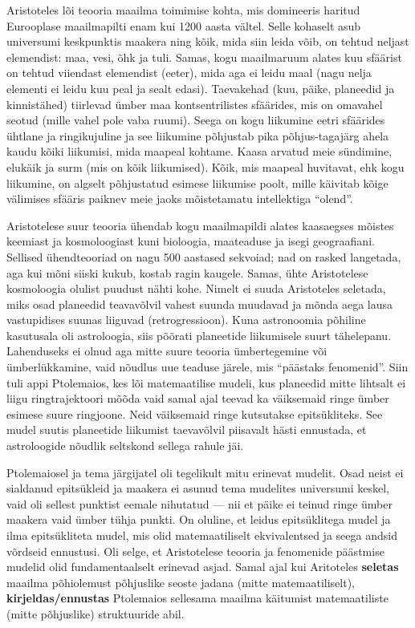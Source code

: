 \documentclass[]{book}
\begin{document}
Aristoteles lõi teooria maailma toimimise kohta, mis domineeris haritud
Eurooplase maailmapilti enam kui 1200 aasta vältel. Selle kohaselt asub
universumi keskpunktis maakera ning kõik, mida siin leida võib, on
tehtud neljast elemendist: maa, vesi, õhk ja tuli. Samas, kogu
maailmaruum alates kuu sfäärist on tehtud viiendast elemendist (eeter),
mida aga ei leidu maal (nagu nelja elementi ei leidu kuu peal ja sealt
edasi). Taevakehad (kuu, päike, planeedid ja kinnistähed) tiirlevad
ümber maa kontsentrilistes sfäärides, mis on omavahel seotud (mille
vahel pole vaba ruumi). Seega on kogu liikumine eetri sfäärides ühtlane
ja ringikujuline ja see liikumine põhjustab pika põhjus-tagajärg ahela
kaudu kõiki liikumisi, mida maapeal kohtame. Kaasa arvatud meie
sündimine, elukäik ja surm (mis on kõik liikumised). Kõik, mis maapeal
huvitavat, ehk kogu liikumine, on algselt põhjustatud esimese liikumise
poolt, mille käivitab kõige välimises sfääris paiknev meie jaoks
mõistetamatu intellektiga ``olend''.

Aristotelese suur teooria ühendab kogu maailmapildi alates kaasaegses
mõistes keemiast ja kosmoloogiast kuni bioloogia, maateaduse ja isegi
geograafiani. Sellised ühendteooriad on nagu 500 aastased sekvoiad; nad
on rasked langetada, aga kui mõni siiski kukub, kostab ragin kaugele.
Samas, ühte Aristotelese kosmoloogia olulist puudust nähti kohe. Nimelt
ei suuda Aristoteles seletada, miks osad planeedid teavavõlvil vahest
suunda muudavad ja mõnda aega lausa vastupidises suunas liiguvad
(retrogressioon). Kuna astronoomia põhiline kasutusala oli astroloogia,
siis põõrati planeetide liikumisele suurt tähelepanu. Lahenduseks ei
olnud aga mitte suure teooria ümbertegemine või ümberlükkamine, vaid
nõudlus uue teaduse järele, mis ``päästaks fenomenid''. Siin tuli appi
Ptolemaios, kes lõi matemaatilise mudeli, kus planeedid mitte lihtsalt
ei liigu ringtrajektoori mõõda vaid samal ajal teevad ka väiksemaid
ringe ümber esimese suure ringjoone. Neid väiksemaid ringe kutsutakse
epitsükliteks. See mudel suutis planeetide liikumist taevavõlvil
piisavalt hästi ennustada, et astroloogide nõudlik seltskond sellega
rahule jäi.

Ptolemaiosel ja tema järgijatel oli tegelikult mitu erinevat mudelit.
Osad neist ei sialdanud epitsükleid ja maakera ei asunud tema mudelites
universumi keskel, vaid oli sellest punktist eemale nihutatud --- nii et
päike ei teinud ringe ümber maakera vaid ümber tühja punkti. On oluline,
et leidus epitsüklitega mudel ja ilma epitsükliteta mudel, mis olid
matemaatiliselt ekvivalentsed ja seega andsid võrdseid ennustusi. Oli
selge, et Aristotelese teooria ja fenomenide päästmise mudelid olid
fundamentaalselt erinevad asjad. Samal ajal kui Aritoteles
\textbf{seletas} maailma põhiolemust põhjuslike seoste jadana (mitte
matemaatiliselt), \textbf{kirjeldas/ennustas} Ptolemaios sellesama
maailma käitumist matemaatiliste (mitte põhjuslike) struktuuride abil.
\end{document}
